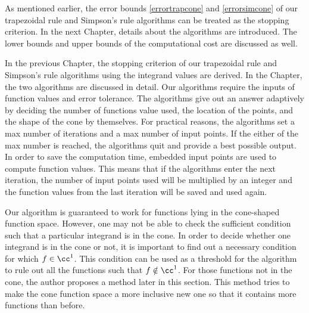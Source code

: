 \documentclass{iitthesis}
\DeclareMathOperator{\Var}{Var}
\theoremstyle{definition}
\theoremstyle{remark}
\begin{document}
As mentioned earlier, the error bounds \eqref{errortrapcone} and \eqref{errorsimcone} of our trapezoidal rule and Simpson's rule algorithms can be treated as the stopping criterion. In the next Chapter, details about the algorithms are introduced. The lower bounds and upper bounds of the computational cost are discussed as well.

%






In the previous Chapter, the stopping criterion of our trapezoidal rule and Simpson's rule algorithms using the integrand values are derived. In the Chapter, the two algorithms are discussed in detail. Our algorithms require the inputs of function values and error tolerance. The algorithms give out an answer adaptively by deciding the number of functions value used, the location of the points, and the shape of the cone by themselves. For practical reasons, the algorithms set a max number of iterations and a max number of input points. If the either of the max number is reached, the algorithms quit and provide a best possible output. In order to save the computation time, embedded input points are used to compute function values. This means that if the algorithms enter the next iteration, the number of input points used will be multiplied by an integer and the function values from the last iteration will be saved and used again.


Our algorithm is guaranteed to work for functions lying in the cone-shaped function space. However, one may not be able to check the sufficient condition such that a particular integrand is in the cone. In order to decide whether one integrand is in the cone or not, it is important to find out a necessary condition for which $f\in\cc^1$. This condition can be used as a threshold for the algorithm to rule out all the functions such that $f\notin\cc^1$. For those functions not in the cone, the author proposes a method later in this section. This method tries to make the cone function space a more inclusive new one so that it contains more functions than before.
\end{document}
